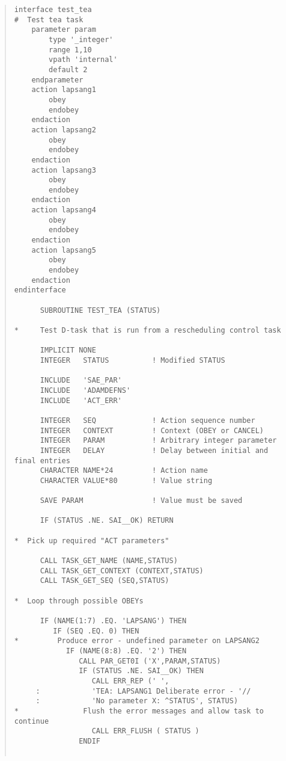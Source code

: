 \documentclass[twoside,11pt]{article}
\renewcommand{\_}{\texttt{\symbol{95}}}
\begin{document}
\small \begin{quote} \begin{verbatim}
interface test_tea
#  Test tea task
    parameter param
        type '_integer'
        range 1,10
        vpath 'internal'
        default 2
    endparameter
    action lapsang1
        obey
        endobey
    endaction
    action lapsang2
        obey
        endobey
    endaction
    action lapsang3
        obey
        endobey
    endaction
    action lapsang4
        obey
        endobey
    endaction
    action lapsang5
        obey
        endobey
    endaction
endinterface

      SUBROUTINE TEST_TEA (STATUS)

*     Test D-task that is run from a rescheduling control task

      IMPLICIT NONE
      INTEGER   STATUS          ! Modified STATUS
 
      INCLUDE   'SAE_PAR'
      INCLUDE   'ADAMDEFNS'
      INCLUDE   'ACT_ERR'
 
      INTEGER   SEQ             ! Action sequence number
      INTEGER   CONTEXT         ! Context (OBEY or CANCEL)
      INTEGER   PARAM           ! Arbitrary integer parameter
      INTEGER   DELAY           ! Delay between initial and final entries
      CHARACTER NAME*24         ! Action name
      CHARACTER VALUE*80        ! Value string
 
      SAVE PARAM                ! Value must be saved

      IF (STATUS .NE. SAI__OK) RETURN

*  Pick up required "ACT parameters"

      CALL TASK_GET_NAME (NAME,STATUS)
      CALL TASK_GET_CONTEXT (CONTEXT,STATUS)
      CALL TASK_GET_SEQ (SEQ,STATUS)

*  Loop through possible OBEYs
 
      IF (NAME(1:7) .EQ. 'LAPSANG') THEN
         IF (SEQ .EQ. 0) THEN
*         Produce error - undefined parameter on LAPSANG2
            IF (NAME(8:8) .EQ. '2') THEN
               CALL PAR_GET0I ('X',PARAM,STATUS)
               IF (STATUS .NE. SAI__OK) THEN
                  CALL ERR_REP (' ',
     :            'TEA: LAPSANG1 Deliberate error - '//
     :            'No parameter X: ^STATUS', STATUS)
*               Flush the error messages and allow task to continue
                  CALL ERR_FLUSH ( STATUS )
               ENDIF


\end{verbatim}
\end{quote}
\end{document}

